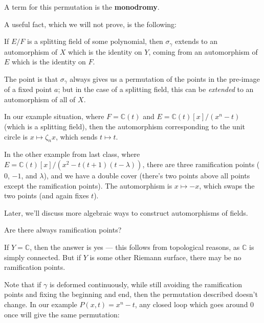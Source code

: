 A term for this permutation is the \textbf{monodromy}. 

A useful fact, which we will not prove, is the following:

\begin{theorem}
    If $E/F$ is a splitting field of some polynomial, then $\sigma_\gamma$ extends to an automorphism of $X$ which is the identity on $Y$, coming from an automorphism of $E$ which is the identity on $F$. 
\end{theorem}

The point is that $\sigma_\gamma$ always gives us a permutation of the points in the pre-image of a fixed point $a$; but in the case of a splitting field, this can be \emph{extended} to an automorphism of all of $X$. 

\begin{example}
    In our example situation, where $F = \mathbb{C}(t)$ and $E = \mathbb{C}(t)[x]/(x^n - t)$ (which is a splitting field), then the automorphism corresponding to the unit circle is $x \mapsto \zeta_n x$, which sends $t \mapsto t$.
\end{example}

\begin{example}
    In the other example from last class, where $E = \mathbb{C}(t)[x]/(x^2 - t(t + 1)(t - \lambda))$, there are three ramification points ($0$, $-1$, and $\lambda$), and we have a double cover (there's two points above all points except the ramification points). The automorphism is $x \mapsto -x$, which swaps the two points (and again fixes $t$). 
\end{example}

Later, we'll discuss more algebraic ways to construct automorphisms of fields. 

\begin{question}
    Are there always ramification points? 
\end{question}

\begin{ans}
    If $Y = \mathbb{C}$, then the answer is yes --- this follows from topological reasons, as $\mathbb{C}$ is simply connected. But if $Y$ is some other Riemann surface, there may be no ramification points. 
\end{ans}

Note that if $\gamma$ is deformed continuously, while still avoiding the ramification points and fixing the beginning and end, then the permutation described doesn't change. In our example $P(x, t) = x^n - t$, any closed loop which goes around $0$ once will give the same permutation:
    
